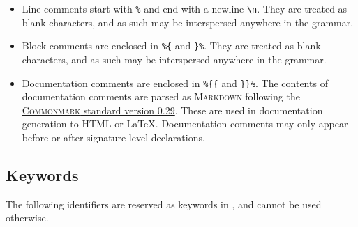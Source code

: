 \begin{itemize}
\item
Line comments start with \texttt{\%} and end with a newline \texttt{\textbackslash n}.
They are treated as blank characters, and as such may be interspersed anywhere in the grammar.
\item
Block comments are enclosed in \texttt{\%\{} and \texttt{\}\%}.
They are treated as blank characters, and as such may be interspersed anywhere in the grammar.
\item
Documentation comments are enclosed in \texttt{\%\{\{} and \texttt{\}\}\%}.
The contents of documentation comments are parsed as \textsc{Markdown} following the \href{https://spec.commonmark.org/0.29}{\textsc{Commonmark} standard version 0.29}.
These are used in documentation generation to \textsc{HTML} or \LaTeX.
Documentation comments may only appear before or after signature-level declarations.
\end{itemize}

\subsection{Keywords}\label{section:keywords-lexical-convention}

The following identifiers are reserved as keywords in \Beluga, and cannot be used otherwise.

